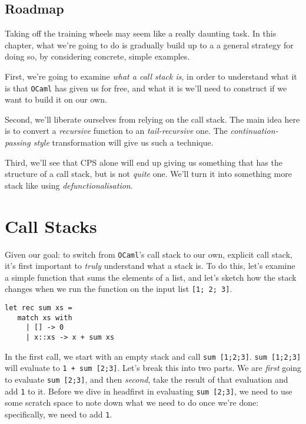 \subsection{Roadmap}
Taking off the training wheels may seem like a really daunting task. In this chapter, what we're going to do is gradually build up to a  a general strategy for doing so, by considering concrete, simple examples.

First, we're going to examine \emph{what a call stack is}, in order to understand what it is that \texttt{OCaml} has given us for free, and what it is we'll need to construct if we want to build it on our own.

Second, we'll liberate ourselves from relying on the call stack. The main idea here is to convert a \emph{recursive} function to an \emph{tail-recursive} one. The \emph{continuation-passing style} transformation will give us such a technique.

Third, we'll see that CPS alone will end up giving us something that has the structure of a call stack, but is not \emph{quite} one. We'll turn it into something more stack like using \emph{defunctionalisation}. 

\section{Call Stacks}
Given our goal: to switch from \texttt{OCaml}'s call stack to our own, explicit call stack, it's first important to \emph{truly} understand what a stack is. To do this, let's examine a simple function that sums the elements of a list, and let's sketch how the stack changes when we run the function on the input list \texttt{[1; 2; 3]}.

\begin{code}
\label{code:sum-ocaml}
\begin{verbatim}
let rec sum xs = 
   match xs with
     | [] -> 0
     | x::xs -> x + sum xs
\end{verbatim}
\end{code}

In the first call, we start with an empty stack and call \texttt{sum [1;2;3]}. \texttt{sum [1;2;3]} will evaluate to \texttt{1 + sum [2;3]}. Let's break this into two parts. We are \emph{first} going to evaluate \texttt{sum [2;3]}, and then \emph{second}, take the result of that evaluation and add \texttt{1} to it. Before we dive in headfirst in evaluating \texttt{sum [2;3]}, we need to use some scratch space to note down what we need to do once we're done: specifically, we need to add \texttt{1}. 

